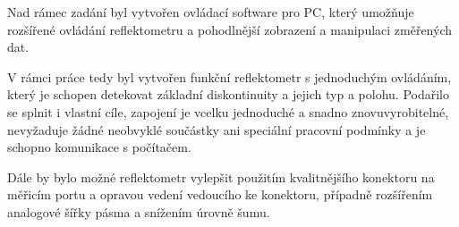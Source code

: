 Nad rámec zadání byl vytvořen ovládací software pro PC, který umožňuje rozšířené ovládání reflektometru a pohodlnější zobrazení a manipulaci změřených dat.

V rámci práce tedy byl vytvořen funkční reflektometr s jednoduchým ovládáním, který je schopen detekovat základní diskontinuity a jejich typ a polohu. Podařilo se splnit i vlastní cíle, zapojení je vcelku jednoduché a snadno znovuvyrobitelné, nevyžaduje žádné neobvyklé součástky ani speciální pracovní podmínky a je schopno komunikace s počítačem.

Dále by bylo možné reflektometr vylepšit použitím kvalitnějšího konektoru na měřicím portu a opravou vedení vedoucího ke konektoru, případně rozšířením analogové šířky pásma a snížením úrovně šumu.